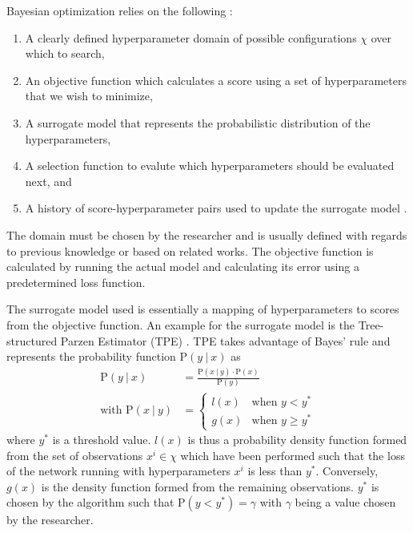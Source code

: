 Bayesian optimization relies on the following \cite{bayesiantds}:
\begin{enumerate}
	\itemsep-1em
	\item A clearly defined hyperparameter domain of possible configurations $\chi$ over which to search,
	\item An objective function which calculates a score using a set of hyperparameters that we wish to minimize,
	\item A surrogate model that represents the probabilistic distribution of the hyperparameters,
	\item A selection function to evalute which hyperparameters should be evaluated next, and
	\item A history of score-hyperparameter pairs used to update the surrogate model .
\end{enumerate}
The domain must be chosen by the researcher and is usually defined with regards to previous knowledge or based on related works.
The objective function is calculated by running the actual model and calculating its error using a predetermined loss function.

The surrogate model used is essentially a mapping of hyperparameters to scores from the objective function.
An example for the surrogate model is the Tree-structured Parzen Estimator (TPE) \cite{tpe}.
TPE takes advantage of Bayes' rule and represents the probability function $\text{P}(y~|~x)$ as
\begin{align}\label{eq:bohb-1}
	\text{P}(y~|~x) &= \frac{\text{P}(x~|~y) \cdot \text{P}(x)}{\text{P}(y)}\\
	\text{with } \text{P}(x~|~y) &=
	\begin{cases}
	l(x) &\text{when } y < y^* \\
	g(x) &\text{when } y \geq y^*
	\end{cases}
\end{align}
where $y^*$ is a threshold value. $l(x)$ is thus a probability density function formed from the set of observations $x^i \in \chi$ which have been performed such that the loss of the network running with hyperparameters $x^i$ is less than $y^*$. 
Conversely, $g(x)$ is the density function formed from the remaining observations.
$y^*$ is chosen by the algorithm such that $\text{P}(y<y^*) = \gamma$ with $\gamma$ being a value chosen by the researcher.

